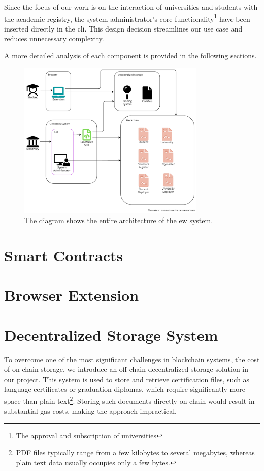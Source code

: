 Since the focus of our work is on the interaction of universities and students with the academic registry, the system administrator's core functionality\footnote{The approval and subscription of universities} have been inserted directly in the \acrshort{cli}. This design decision streamlines our use case and reduces unnecessary complexity.

A more detailed analysis of each component is provided in the following sections.

\begin{figure}
  \centering
  \includegraphics[width=0.8\textwidth]{figures/Architecture diagram complete.pdf}
  \caption[System architecture diagram]{The diagram shows the entire architecture of the \acrlong{ew} system.}
  \label{fig:fullArchDiag}
\end{figure}

\section{Smart Contracts}
\label{sec:smartContractsDesign}

\section{Browser Extension}
\label{sec:browserExtensionDesign}

\section{Decentralized Storage System}
\label{sec:decStorageDesgn}
To overcome one of the most significant challenges in blockchain systems, the cost of on-chain storage, we introduce an off-chain decentralized storage solution in our project. This system is used to store and retrieve certification files, such as language certificates or graduation diplomas, which require significantly more space than plain text\footnote{PDF files typically range from a few kilobytes to several megabytes, whereas plain text data usually occupies only a few bytes.}. Storing such documents directly on-chain would result in substantial gas costs, making the approach impractical. 

